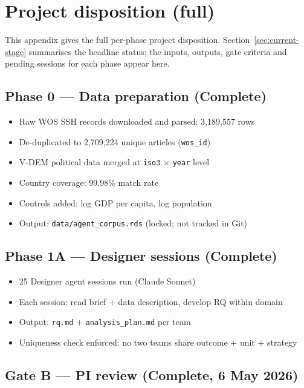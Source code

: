 \documentclass[12pt,a4paper]{article}
\begin{document}
\section{Project disposition (full)}
\label{app:disposition}

This appendix gives the full per-phase project disposition. Section~\ref{sec:current-stage} summarises the headline status; the inputs, outputs, gate criteria and pending sessions for each phase appear here.

\subsection*{Phase 0 --- Data preparation (Complete)}

\begin{itemize}
  \item Raw WOS SSH records downloaded and parsed: 3,189,557 rows
  \item De-duplicated to 2,709,224 unique articles (\texttt{wos\_id})
  \item V-DEM political data merged at \texttt{iso3} $\times$ \texttt{year} level
  \item Country coverage: 99.98\% match rate
  \item Controls added: log GDP per capita, log population
  \item Output: \texttt{data/agent\_corpus.rds} (locked; not tracked in Git)
\end{itemize}

\subsection*{Phase 1A --- Designer sessions (Complete)}

\begin{itemize}
  \item 25 Designer agent sessions run (Claude Sonnet)
  \item Each session: read brief + data description, develop RQ within domain
  \item Output: \texttt{rq.md} + \texttt{analysis\_plan.md} per team
  \item Uniqueness check enforced: no two teams share outcome + unit + strategy
\end{itemize}

\subsection*{Gate B --- PI review (Complete, 6 May 2026)}
\end{document}

